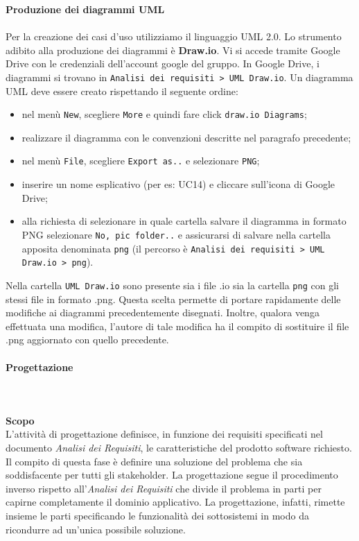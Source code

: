 			
			\noindent\textbf{Produzione dei diagrammi UML} \mbox{}\\ \mbox{}\\
			Per la creazione dei casi d'uso utilizziamo il linguaggio UML 2.0.
			Lo strumento adibito alla produzione dei diagrammi è \textbf{Draw.io}.
			Vi si accede tramite Google Drive con le credenziali dell'account google del gruppo.
			In Google Drive, i diagrammi si trovano in \texttt{Analisi dei requisiti > UML Draw.io}.
			Un diagramma UML deve essere creato rispettando il seguente ordine:
			\begin{itemize}
				\item nel menù \texttt{New}, scegliere \texttt{More} e quindi fare
				click \texttt{draw.io Diagrams};
				\item realizzare il diagramma con le convenzioni descritte nel paragrafo precedente; 
				\item nel menù \texttt{File}, scegliere \texttt{Export as..} e selezionare \texttt{PNG};
				\item inserire un nome esplicativo (per es: UC14) e cliccare sull'icona di
				Google Drive;
				\item alla richiesta di selezionare in quale cartella salvare il diagramma 
				in formato PNG selezionare \texttt{No, pic folder..} e assicurarsi di salvare 
				nella cartella apposita denominata \texttt{png} (il percorso è 
				\texttt{Analisi dei requisiti > UML Draw.io > png}).
			\end{itemize}
			Nella cartella \texttt{UML Draw.io} sono presente sia i file .io sia la cartella \texttt{png} con gli stessi file in formato .png.
			Questa scelta permette di portare rapidamente delle modifiche ai diagrammi precedentemente disegnati.
			Inoltre, qualora venga effettuata una modifica, l'autore di tale modifica ha il compito di sostituire il file .png aggiornato con quello precedente. 
					
		\paragraph{Progettazione} \mbox{}\\ \mbox{}\\
			\noindent\textbf{Scopo} \mbox{}\\
			
			\noindent L'attività di progettazione definisce, in funzione dei requisiti specificati 
			nel documento \textit{Analisi dei Requisiti}, le caratteristiche del prodotto 
			software richiesto. Il compito di questa fase è definire una soluzione del 
			problema che sia soddisfacente per tutti gli stakeholder. La progettazione segue 
			il procedimento inverso rispetto all'\textit{Analisi dei Requisiti} che divide 
			il problema in parti per capirne completamente il dominio applicativo. La 
			progettazione, infatti, rimette insieme le parti specificando le funzionalità 
			dei sottosistemi in modo da ricondurre ad un'unica possibile soluzione. \newline 
			
